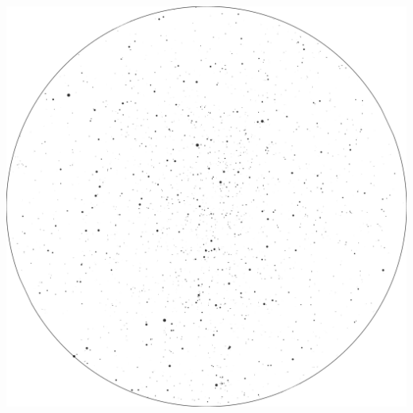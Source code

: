 \documentclass{./SAS-class-skygen}
\begin{document}
	\vspace{0.5cm}
    \begin{center}
    \includegraphics[width=\textwidth]{./pics/skychart41.png}
    \end{center}
    
    
\end{document}
